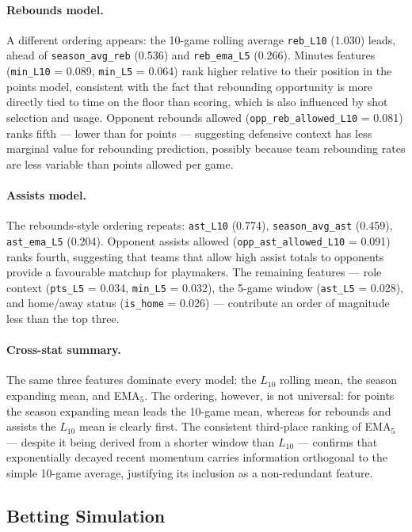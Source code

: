 \documentclass[12pt, letterpaper]{article}
\begin{document}
\paragraph{Rebounds model.}
A different ordering appears: the 10-game rolling average
\texttt{reb\_L10} (1.030) leads, ahead of \texttt{season\_avg\_reb}
(0.536) and \texttt{reb\_ema\_L5} (0.266).
Minutes features (\texttt{min\_L10} = 0.089, \texttt{min\_L5} = 0.064)
rank higher relative to their position in the points model, consistent
with the fact that rebounding opportunity is more directly tied to time
on the floor than scoring, which is also influenced by shot selection
and usage.
Opponent rebounds allowed (\texttt{opp\_reb\_allowed\_L10} = 0.081)
ranks fifth --- lower than for points --- suggesting defensive context
has less marginal value for rebounding prediction, possibly because
team rebounding rates are less variable than points allowed per game.

\paragraph{Assists model.}
The rebounds-style ordering repeats: \texttt{ast\_L10} (0.774),
\texttt{season\_avg\_ast} (0.459), \texttt{ast\_ema\_L5} (0.204).
Opponent assists allowed (\texttt{opp\_ast\_allowed\_L10} = 0.091) ranks
fourth, suggesting that teams that allow high assist totals to opponents
provide a favourable matchup for playmakers.
The remaining features --- role context (\texttt{pts\_L5} = 0.034,
\texttt{min\_L5} = 0.032), the 5-game window (\texttt{ast\_L5} = 0.028),
and home/away status (\texttt{is\_home} = 0.026) --- contribute an order
of magnitude less than the top three.

\paragraph{Cross-stat summary.}
The same three features dominate every model: the $L_{10}$ rolling mean,
the season expanding mean, and EMA$_5$.
The ordering, however, is not universal: for points the season expanding
mean leads the 10-game mean, whereas for rebounds and assists the
$L_{10}$ mean is clearly first.
The consistent third-place ranking of EMA$_5$ --- despite it being
derived from a shorter window than $L_{10}$ --- confirms that
exponentially decayed recent momentum carries information orthogonal
to the simple 10-game average, justifying its inclusion as a
non-redundant feature.

\subsection{Betting Simulation}
\end{document}
